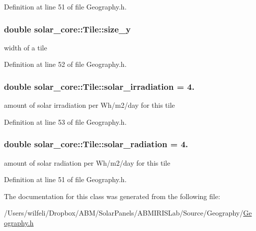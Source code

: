 Definition at line 51 of file Geography.\+h.

\hypertarget{classsolar__core_1_1_tile_a698ac57539f58ed4e0a54b3135be6fb9}{}
\subsubsection[{size\+\_\+y}]{\setlength{\rightskip}{0pt plus 5cm}double solar\+\_\+core\+::\+Tile\+::size\+\_\+y}\label{classsolar__core_1_1_tile_a698ac57539f58ed4e0a54b3135be6fb9}
width of a tile 

Definition at line 52 of file Geography.\+h.

\hypertarget{classsolar__core_1_1_tile_a2062d4ffe05c6f6282975f71f2d24441}{}
\subsubsection[{solar\+\_\+irradiation}]{\setlength{\rightskip}{0pt plus 5cm}double solar\+\_\+core\+::\+Tile\+::solar\+\_\+irradiation = 4.}\label{classsolar__core_1_1_tile_a2062d4ffe05c6f6282975f71f2d24441}
amount of solar irradiation per Wh/m2/day for this tile 

Definition at line 53 of file Geography.\+h.

\hypertarget{classsolar__core_1_1_tile_aae222e441b1dfe68cc6b78bb946f5e02}{}
\subsubsection[{solar\+\_\+radiation}]{\setlength{\rightskip}{0pt plus 5cm}double solar\+\_\+core\+::\+Tile\+::solar\+\_\+radiation = 4.}\label{classsolar__core_1_1_tile_aae222e441b1dfe68cc6b78bb946f5e02}
amount of solar radiation per Wh/m2/day for this tile 

Definition at line 51 of file Geography.\+h.



The documentation for this class was generated from the following file\+:\begin{DoxyCompactItemize}
\item 
/\+Users/wilfeli/\+Dropbox/\+A\+B\+M/\+Solar\+Panels/\+A\+B\+M\+I\+R\+I\+S\+Lab/\+Source/\+Geography/\hyperlink{_geography_8h}{Geography.\+h}\end{DoxyCompactItemize}
